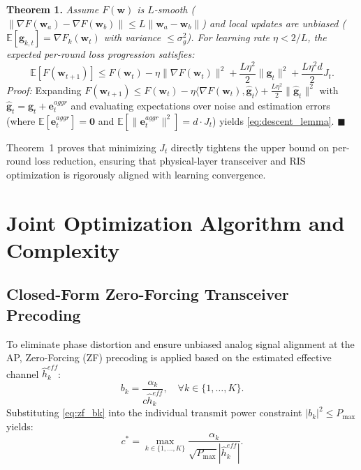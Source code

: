 \documentclass[journal,twocolumn]{IEEEtran}
\begin{document}
\textbf{Theorem 1.} \textit{Assume $F(\mathbf{w})$ is $L$-smooth ($\|\nabla F(\mathbf{w}_a) - \nabla F(\mathbf{w}_b)\| \le L \|\mathbf{w}_a - \mathbf{w}_b\|$) and local updates are unbiased ($\mathbb{E}[\mathbf{g}_{k,t}] = \nabla F_k(\mathbf{w}_t)$ with variance $\le \sigma_g^2$). For learning rate $\eta < 2/L$, the expected per-round loss progression satisfies:}
\begin{equation}
    \mathbb{E}[F(\mathbf{w}_{t+1})] \le F(\mathbf{w}_t) - \eta \|\nabla F(\mathbf{w}_t)\|^2 + \frac{L \eta^2}{2} \|\mathbf{g}_t\|^2 + \frac{L \eta^2 d}{2} J_t.
    \label{eq:descent_lemma}
\end{equation}
\textit{Proof:} Expanding $F(\mathbf{w}_{t+1}) \le F(\mathbf{w}_t) - \eta \langle \nabla F(\mathbf{w}_t), \hat{\mathbf{g}}_t \rangle + \frac{L \eta^2}{2} \|\hat{\mathbf{g}}_t\|^2$ with $\hat{\mathbf{g}}_t = \mathbf{g}_t + \mathbf{e}_t^{aggr}$ and evaluating expectations over noise and estimation errors (where $\mathbb{E}[\mathbf{e}_t^{aggr}] = \mathbf{0}$ and $\mathbb{E}[\|\mathbf{e}_t^{aggr}\|^2] = d \cdot J_t$) yields \eqref{eq:descent_lemma}. \hfill $\blacksquare$

Theorem~1 proves that minimizing $J_t$ directly tightens the upper bound on per-round loss reduction, ensuring that physical-layer transceiver and RIS optimization is rigorously aligned with learning convergence.

\section{Joint Optimization Algorithm and Complexity}

\subsection{Closed-Form Zero-Forcing Transceiver Precoding}
To eliminate phase distortion and ensure unbiased analog signal alignment at the AP, Zero-Forcing (ZF) precoding is applied based on the estimated effective channel $\hat{h}_k^{eff}$:
\begin{equation}
    b_k = \frac{\alpha_k}{c \hat{h}_k^{eff}}, \quad \forall k \in \{1, \dots, K\}.
    \label{eq:zf_bk}
\end{equation}
Substituting \eqref{eq:zf_bk} into the individual transmit power constraint $|b_k|^2 \le P_{\max}$ yields:
\begin{equation}
    c^* = \max_{k \in \{1,\dots,K\}} \frac{\alpha_k}{\sqrt{P_{\max}} |\hat{h}_k^{eff}|}.
    \label{eq:zf_c}
\end{equation}
\end{document}
